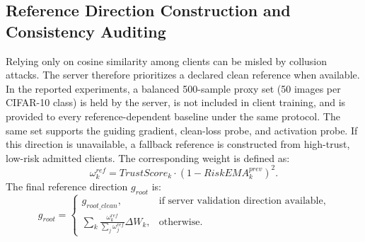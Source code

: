 \documentclass[final,5p,times,twocolumn]{elsarticle/elsarticle}
\begin{document}
\subsection{Reference Direction Construction and Consistency Auditing}
Relying only on cosine similarity among clients can be misled by collusion attacks. The server therefore prioritizes a declared clean reference when available. In the reported experiments, a balanced 500-sample proxy set (50 images per CIFAR-10 class) is held by the server, is not included in client training, and is provided to every reference-dependent baseline under the same protocol. The same set supports the guiding gradient, clean-loss probe, and activation probe. If this direction is unavailable, a fallback reference is constructed from high-trust, low-risk admitted clients. The corresponding weight is defined as:
\begin{equation}
    \omega_{k}^{ref} = TrustScore_{k} \cdot (1 - RiskEMA_{k}^{prev})^{2}.
\end{equation}
The final reference direction $g_{root}$ is:
\begin{equation}
    g_{root}=
    \begin{cases}
        g_{root\_clean},                                                      & \text{if server validation direction available}, \\
        \sum_{k} \frac{\omega_{k}^{ref}}{\sum_j \omega_{j}^{ref}} \Delta W_k, & \text{otherwise}.
    \end{cases}
\end{equation}
\end{document}
